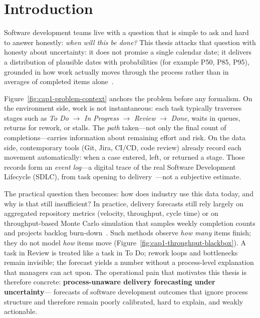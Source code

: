 \chapter{Introduction}
\label{ch:introduction}

Software development teams live with a question that is simple to ask and
hard to answer honestly: \emph{when will this be done?}
This thesis attacks that question with honesty about uncertainty:
it does not promise a single calendar date; it delivers a distribution of
plausible dates with probabilities (for example P50, P85, P95), grounded
in how work actually moves through the process rather than in averages of
completed items alone~\cite{vacanti2015}.

Figure~\ref{fig:cap1-problem-context} anchors the problem before any
formalism.
On the environment side, work is not instantaneous: each task typically
traverses stages such as
\textit{To Do} $\rightarrow$ \textit{In Progress} $\rightarrow$
\textit{Review} $\rightarrow$ \textit{Done}, waits in queues, returns for
rework, or stalls.
The \emph{path} taken---not only the final count of completions---carries
information about remaining effort and risk.
On the data side, contemporary tools (Git, Jira, CI/CD, code review)
already record each movement automatically: when a case entered, left, or
returned a stage.
Those records form an \emph{event log}---a digital trace of the real
Software Development Lifecycle (SDLC), from task opening to
delivery~\cite{cook1998,rubin2007,poncin2011process}---not a subjective
estimate.



The practical question then becomes: how does industry use this data
today, and why is that still insufficient?
In practice, delivery forecasts still rely largely on aggregated
repository metrics (velocity, throughput, cycle time) or on
throughput-based Monte Carlo simulation that samples weekly completion
counts and projects backlog burn-down~\cite{vacanti2015}.
Such methods observe \emph{how many} items finish; they do not model
\emph{how} items move (Figure~\ref{fig:cap1-throughput-blackbox}).
A task in Review is treated like a task in To Do; rework loops and
bottlenecks remain invisible; the forecast yields a number without a
process-level explanation that managers can act upon.
The operational pain that motivates this thesis is therefore concrete:
\textbf{process-unaware delivery forecasting under uncertainty}---
forecasts of software development outcomes that ignore process structure
and therefore remain poorly calibrated, hard to explain, and weakly
actionable.

